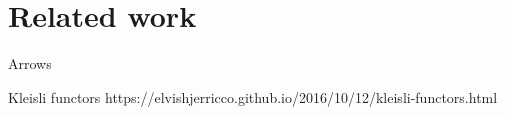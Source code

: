 \section{Related work}\label{sec-related}

Arrows

Kleisli functors
https://elvishjerricco.github.io/2016/10/12/kleisli-functors.html


